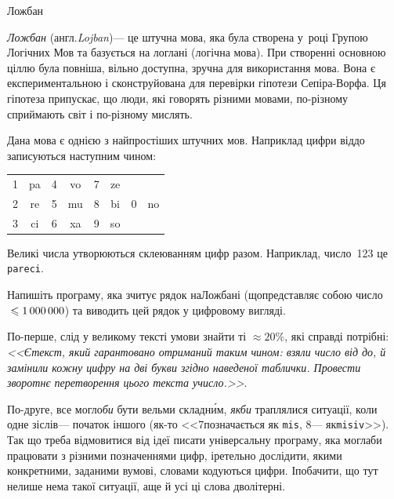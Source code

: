 \documentclass[14pt,a4paper]{extarticle}
\begin{document}
\begin{problemAllDefault}{Ложбан}

\emph{Ложбан} (англ.\nolinebreak[3] \emph{Lojban})\nolinebreak[3] --- це штучна мова, яка була створена у~році Групою Логічних Мов та базується на логлані (логічна мова). При створенні основною ціллю була повніша, вільно доступна, зручна для використання мова. Вона є експериментальною і сконструйована для перевірки гіпотези Сепіра-Ворфа. Ця гіпотеза припускає, що люди, які говорять різними мовами, по-різному сприймають світ і по-різному мислять.

Дана мова є однією з найпростіших штучних мов. Наприклад цифри від\nolinebreak[1] до записуються наступним чином:

\begin{center}
\begin{ttfamily}
\begin{tabular}{cc@{ ~ ~ ~ }cc@{ ~ ~ ~ }cc@{ ~ ~ ~ }cc}
1 & pa	&	4 & vo	&	7 & ze				\\
2 & re	&	5 & mu	&	8 & bi	&	0 & no	\\
3 & ci	&	6 & xa	&	9 & so				
\end{tabular}
\end{ttfamily}

\end{center}

Великі числа утворюються склеюванням цифр разом. Наприклад, число~123 це \texttt{pareci}.

\Task	\hspace{0pt minus 0.5em}Напишіть програму, яка зчитує рядок на\nolinebreak[2] Ложбані (що\nolinebreak[3] представляє собою число${}\leqslant1\,000\,000$) та виводить цей рядок у цифровому вигляді.

\Example
\begin{exampleSimple}{5em}{3em}%
%
\end{exampleSimple}

\end{problemAllDefault}
	

\Tutorial	По-перше, слід у великому тексті умови знайти ті ${\approx}20\%$, які справді потрібні: \textsl{<<Є\nolinebreak[3] текст, який гарантовано отриманий таким чином: взяли число від до, й замінили кожну цифру на дві букви згідно наведеної таблички. Провести зворотнє перетворення цього текста у\nolinebreak[3] число.>>}.

По-друге, все могло\nolinebreak[3] \emph{би} бути вельми складн\'{и}м, \emph{якби} траплялися ситуації, коли одне зі\nolinebreak[2] слів\nolinebreak[3] --- початок іншого (як-то <<7\nolinebreak[3] позначається як \texttt{mis}, 8\nolinebreak[3] --- як\nolinebreak[2] \texttt{misiv}>>). Так що треба відмовитися від ідеї писати універсальну програму, яка могла\nolinebreak[3] би працювати з різними позначеннями цифр, і\nolinebreak[3] ретельно дослідити, якими конкретними, заданими в\nolinebreak[3] умові, словами кодуються цифри. І\nolinebreak[3] побачити, що тут не\nolinebreak[3] лише нема такої ситуації, а\nolinebreak[3] ще й усі ці слова дволітерні. 
\end{document}
